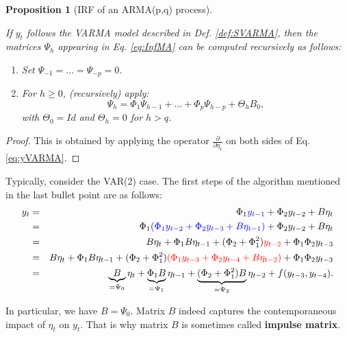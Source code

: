 \documentclass[
  11pt,
]{book}
\providecommand{\tightlist}{%
  \setlength{\itemsep}{0pt}\setlength{\parskip}{0pt}}
\newtheorem{proposition}{Proposition}[chapter]
\theoremstyle{definition}
\theoremstyle{definition}
\theoremstyle{definition}
\theoremstyle{definition}
\theoremstyle{remark}
\begin{document}
\begin{proposition}[IRF of an ARMA(p,q) process]
\protect\hypertarget{prp:computPsi}{}\label{prp:computPsi}

If \(y_t\) follows the VARMA model described in Def. \ref{def:SVARMA}, then the matrices \(\Psi_h\) appearing in Eq. \eqref{eq:InfMA} can be computed recursively as follows:

\begin{enumerate}
\def\labelenumi{\arabic{enumi}.}
\tightlist
\item
  Set \(\Psi_{-1}=\dots=\Psi_{-p}=0\).
\item
  For \(h \ge 0\), (recursively) apply:
  \[
  \Psi_h = \Phi_1 \Psi_{h-1} + \dots + \Phi_p \Psi_{h-p} + \Theta_h B_0,
  \]
  with \(\Theta_0 = Id\) and \(\Theta_h = 0\) for \(h>q\).
\end{enumerate}

\end{proposition}

\begin{proof}
This is obtained by applying the operator \(\frac{\partial}{\partial \eta_{t}}\) on both sides of Eq. \eqref{eq:yVARMA}.
\end{proof}

Typically, consider the VAR(2) case. The first steps of the algorithm mentioned in the last bullet point are as follows:
\begin{eqnarray*}
y_t &=& \Phi_1 {\color{blue}y_{t-1}} + \Phi_2 y_{t-2} + B \eta_t  \\
&=& \Phi_1 {\color{blue}(\Phi_1 y_{t-2} + \Phi_2 y_{t-3} + B \eta_{t-1})} + \Phi_2 y_{t-2} + B \eta_t  \\
&=& B \eta_t + \Phi_1 B \eta_{t-1} + (\Phi_2 + \Phi_1^2) {\color{red}y_{t-2}} + \Phi_1\Phi_2 y_{t-3}  \\
&=& B \eta_t + \Phi_1 B \eta_{t-1} + (\Phi_2 + \Phi_1^2) {\color{red}(\Phi_1 y_{t-3} + \Phi_2 y_{t-4} + B \eta_{t-2})} + \Phi_1\Phi_2 y_{t-3} \\
&=& \underbrace{B}_{=\Psi_0} \eta_t + \underbrace{\Phi_1 B}_{=\Psi_1} \eta_{t-1} + \underbrace{(\Phi_2 + \Phi_1^2)B}_{=\Psi_2} \eta_{t-2} + f(y_{t-3},y_{t-4}).
\end{eqnarray*}

In particular, we have \(B = \Psi_0\). Matrix \(B\) indeed captures the contemporaneous impact of \(\eta_t\) on \(y_t\). That is why matrix \(B\) is sometimes called \textbf{impulse matrix}.
\end{document}
